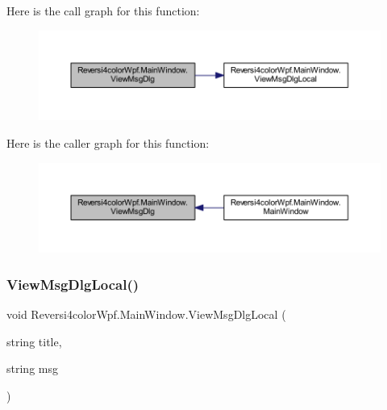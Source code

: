 Here is the call graph for this function\+:
\nopagebreak
\begin{figure}[H]
\begin{center}
\leavevmode
\includegraphics[width=350pt]{class_reversi4color_wpf_1_1_main_window_a831a8cf1b728a5a24904633e707068bd_cgraph}
\end{center}
\end{figure}
Here is the caller graph for this function\+:
\nopagebreak
\begin{figure}[H]
\begin{center}
\leavevmode
\includegraphics[width=350pt]{class_reversi4color_wpf_1_1_main_window_a831a8cf1b728a5a24904633e707068bd_icgraph}
\end{center}
\end{figure}
\mbox{\label{class_reversi4color_wpf_1_1_main_window_ab27e29687aa1b84ddac23a0c68fcfa56}} 
\subsubsection{\texorpdfstring{View\+Msg\+Dlg\+Local()}{ViewMsgDlgLocal()}}
{\footnotesize\ttfamily void Reversi4color\+Wpf.\+Main\+Window.\+View\+Msg\+Dlg\+Local (\begin{DoxyParamCaption}\item[{string}]{title,  }\item[{string}]{msg }\end{DoxyParamCaption})}



